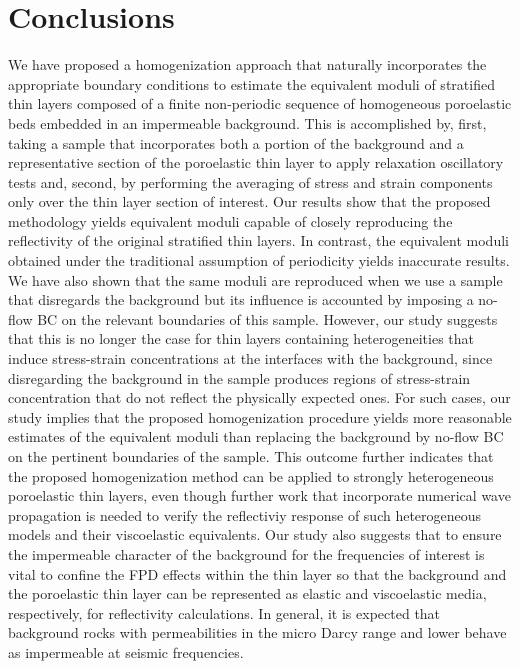 \documentclass[draft]{agujournal2019}
\begin{document}
\section{Conclusions}
We have proposed a homogenization approach that naturally incorporates the appropriate boundary conditions to estimate the equivalent moduli of stratified thin layers composed of a finite non-periodic sequence of homogeneous poroelastic beds embedded in an impermeable background.
This is accomplished by, first, taking a sample that incorporates both a portion of the background and a representative section of the poroelastic thin layer to apply relaxation oscillatory tests and, second, by performing the averaging of stress and strain components only over the thin layer section of interest.
Our results show that the proposed methodology yields equivalent moduli capable of closely reproducing the reflectivity of the original stratified thin layers. In contrast, the equivalent moduli obtained under the traditional assumption of periodicity yields inaccurate results. We  have also shown that the same moduli are reproduced when we use a sample that disregards the background but its influence is accounted by imposing a no-flow BC on the relevant boundaries of this sample. However, our study suggests that this is no longer the case for thin layers containing heterogeneities that induce stress-strain concentrations at the interfaces with the background, since disregarding the background in the sample produces regions of stress-strain concentration that do not reflect the physically expected ones. For such cases, our study implies that the proposed homogenization procedure yields more reasonable estimates of the equivalent moduli than replacing the background by no-flow BC on the pertinent boundaries of the sample. This outcome further indicates that the proposed homogenization method can be applied to strongly heterogeneous poroelastic thin layers, even though further work that incorporate numerical wave propagation is needed to verify the reflectiviy response of such heterogeneous models and their viscoelastic equivalents. Our study also suggests that to ensure the impermeable character
of the background for the frequencies of interest is vital to confine the FPD effects within the thin layer so that the background and the poroelastic thin layer can be represented as elastic and viscoelastic media, respectively, for reflectivity calculations. In general, it is expected that background rocks with permeabilities in the micro Darcy range and lower behave as impermeable at seismic frequencies.
\end{document}
